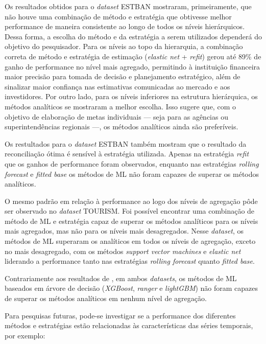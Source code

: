 \documentclass[
  12pt,
  twoside,
  openright,
  a4paper,
  chapter=TITLE,
  section=TITLE,
  brazil]{abntex2}
\begin{document}
Os resultados obtidos para o \emph{dataset} ESTBAN mostraram,
primeiramente, que não houve uma combinação de método e estratégia que
obtivesse melhor performance de maneira consistente ao longo de todos os
níveis hierárquicos. Dessa forma, a escolha do método e da estratégia a
serem utilizados dependerá do objetivo do pesquisador. Para os níveis ao
topo da hierarquia, a combinação correta de método e estratégia de
estimação (\emph{elastic net} + \emph{refit}) gerou até 89\% de ganho de
performance no nível mais agregado, permitindo à instituição financeira
maior precisão para tomada de decisão e planejamento estratégico, além
de sinalizar maior confiança nas estimativas comunicadas ao mercado e
aos investidores. Por outro lado, para os níveis inferiores na estrutura
hierárquica, os métodos analíticos se mostraram a melhor escolha. Isso
sugere que, com o objetivo de elaboração de metas individuais --- seja
para as agências ou superintendências regionais ---, os métodos
analíticos ainda são preferíveis.

Os restultados para o \emph{dataset} ESTBAN também mostram que o
resultado da reconciliação ótima é sensível à estratégia utilizada.
Apenas na estratégia \emph{refit} que os ganhos de performance foram
observados, enquanto nas estratégias \emph{rolling forecast} e
\emph{fitted base} os métodos de ML não foram capazes de superar os
métodos analíticos.

O mesmo padrão em relação à performance ao logo dos níveis de agregação
pôde ser observado no \emph{dataset} TOURISM. Foi possível encontrar uma
combinação de método de ML e estratégia capaz de superar os métodos
analíticos para os níveis mais agregados, mas não para os níveis mais
desagregados. Nesse \emph{dataset}, os métodos de ML superaram os
analíticos em todos os níveis de agregação, exceto no mais desagregado,
com os métodos \emph{support vector machines} e \emph{elastic net}
liderando a performance tanto nas estratégias \emph{rolling forecast}
quanto \emph{fitted base}.

Contrariamente aos resultados de \textcite{spiliotis_hierarchical_2021},
em ambos \emph{datasets}, os métodos de ML baseados em árvore de decisão
(\emph{XGBoost}, \emph{ranger} e \emph{lightGBM}) não foram capazes de
superar os métodos analíticos em nenhum nível de agregação.

Para pesquisas futuras, pode-se investigar se a performance dos
diferentes métodos e estratégias estão relacionadas às características
das séries temporais, por exemplo:
\end{document}
